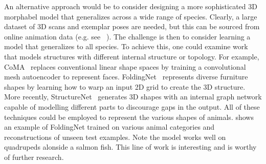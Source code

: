 
An alternative approach would be to consider designing a more sophisticated 3D morphabel model that generalizes across a wide range of species. Clearly, a large dataset of 3D scans and exemplar poses are needed, but this can be sourced from online animation data (e.g. see ~). The challenge is then to consider learning a model that generalizes to all species. To achieve this, one could examine work that models structures with different internal structure or topology. For example, CoMA~ replaces conventional linear shape spaces by training a convolutional mesh autoencoder to represent faces. FoldingNet~ represents diverse furniture shapes by learning how to warp an input 2D grid to create the 3D structure. More recently, StructureNet~ generates 3D shapes with an internal graph network capable of modelling different parts to discourage gaps in the output. All of these techniques could be employed to represent the various shapes of animals.  shows an example of FoldingNet trained on various animal categories and reconstructions of unseen test examples. Note the model works well on quadrupeds alonside a salmon fish. This line of work is interesting and is worthy of further research.






